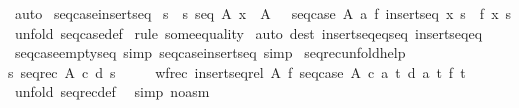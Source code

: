 \begin{isabellebody}
\isamarkupfalse%
\ auto\isanewline
{}\isamarkupfalse%
%
\endisatagproof
{\isafoldproof}%
%
\isadelimproof
\isanewline
%
\endisadelimproof
\isanewline
\isanewline
{}\isamarkupfalse%
\ seq{\isacharunderscore}case{\isacharunderscore}insertseq{\isacharcolon}\ \isanewline
{\isachardoublequoteopen}{\isacharbang}{\isacharbang}s{\isachardot}\ {\isacharbrackleft}{\isacharbar}\ s{\isacharcolon}\ seq\ A{\isacharsemicolon}\ x\ {\isacharcolon}\ A\ {\isacharbar}{\isacharbrackright}\ {\isacharequal}{\isacharequal}{\isachargreater}\ seq{\isacharunderscore}case\ A\ a\ f\ {\isacharparenleft}insertseq\ x\ s{\isacharparenright}\ {\isacharequal}\ f\ x\ s{\isachardoublequoteclose}\isanewline
%
\isadelimproof
\isanewline
%
\endisadelimproof
%
\isatagproof
{}\isamarkupfalse%
\ {\isacharparenleft}unfold\ seq{\isacharunderscore}case{\isacharunderscore}def{\isacharparenright}\isanewline
{}\isamarkupfalse%
\ {\isacharparenleft}rule\ some{\isacharunderscore}equality{\isacharparenright}\isanewline
{}\isamarkupfalse%
\ {\isacharparenleft}auto\ dest{\isacharcolon}\ insertseq{\isacharunderscore}eq{\isacharunderscore}seq\ insertseq{\isacharunderscore}eq{\isacharparenright}\isanewline
{}\isamarkupfalse%
%
\endisatagproof
{\isafoldproof}%
%
\isadelimproof
\isanewline
%
\endisadelimproof
\isanewline
{}\isamarkupfalse%
\ seq{\isacharunderscore}case{\isacharunderscore}emptyseq\ {\isacharbrackleft}simp{\isacharbrackright}\ seq{\isacharunderscore}case{\isacharunderscore}insertseq\ {\isacharbrackleft}simp{\isacharbrackright}\isanewline
\isanewline
{}\isamarkupfalse%
\ seq{\isacharunderscore}rec{\isacharunderscore}unfold{\isacharunderscore}help{\isacharcolon}\ \isanewline
{\isachardoublequoteopen}{\isacharparenleft}{\isacharpercent}s{\isachardot}\ seq{\isacharunderscore}rec\ A\ c\ d\ s{\isacharparenright}\ {\isacharequal}\ \ \isanewline
\ \ wfrec\ {\isacharparenleft}insertseq{\isacharunderscore}rel\ A{\isacharparenright}\ {\isacharparenleft}{\isacharpercent}f{\isachardot}\ seq{\isacharunderscore}case\ A\ c\ {\isacharparenleft}{\isacharpercent}a\ t{\isachardot}\ d\ a\ t\ {\isacharparenleft}f\ t{\isacharparenright}{\isacharparenright}{\isacharparenright}{\isachardoublequoteclose}\isanewline
%
\isadelimproof
%
\endisadelimproof
%
\isatagproof
{}\isamarkupfalse%
\ {\isacharparenleft}unfold\ seq{\isacharunderscore}rec{\isacharunderscore}def\ {\isacharparenright}\isanewline
{}\isamarkupfalse%
\ {\isacharparenleft}simp\ {\isacharparenleft}no{\isacharunderscore}asm{\isacharparenright}{\isacharparenright}\isanewline

\end{isabellebody}
